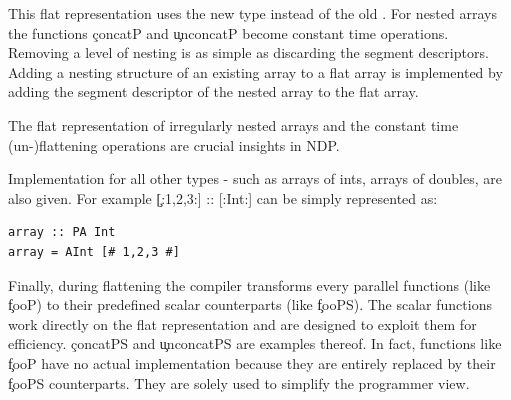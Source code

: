       This flat representation uses the new type 
      instead of the old \type{[:[:Int:]:]}. 
      For nested arrays the functions \c{concatP} and \c{unconcatP}
      become constant time operations. Removing a level of nesting
      is as simple as discarding the segment descriptors.
      Adding a nesting structure of an existing array to a flat array
      is implemented by adding the segment descriptor of the nested array to the
      flat array.
      
      The flat representation of irregularly nested arrays
      and the constant time (un-)flattening operations are crucial insights in
      NDP.
      
      Implementation for all other types - such as arrays of ints,
      arrays of doubles, are also given. For example \c{[:1,2,3:] :: [:Int:]} can be simply
      represented as:
      \begin{lstlisting}
array :: PA Int
array = AInt [# 1,2,3 #]
      \end{lstlisting}
      
      Finally, during flattening the compiler transforms
      every parallel functions (like \c{fooP}) to
      their predefined scalar counterparts (like \c{fooPS}).
      The scalar functions work directly on the flat representation
      and are designed to exploit them for efficiency.
      \c{concatPS} and \c{unconcatPS} are examples thereof.
      In fact, functions like \c{fooP} have no actual implementation
      because they are entirely replaced by their \c{fooPS} counterparts.
      They are solely used to simplify the programmer view.
    
      
